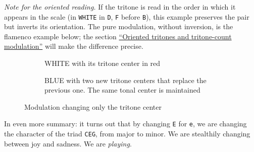 \documentclass[]{report}
\begin{document}
\emph{Note for the oriented reading.} If the tritone is read in the order in
which it appears in the scale (in \texttt{WHITE} in \texttt{D}, \texttt{F}
before \texttt{B}), this example preserves the pair but inverts its
orientation. The pure modulation, without inversion, is the flamenco example
below; the section \hyperref[sec:oriented-tritones]{``Oriented tritones and tritone-count modulation''} will make the difference precise.
\begin{figure}[H]
	\begin{subfigure}{.29\textwidth}
		\centering
		\caption{\textsf{WHITE} with its tritone center in red}

	\end{subfigure}
	\hfill
	\begin{subfigure}{0.29\textwidth}
		\centering
		\caption{\textsf{BLUE} with two new tritone centers that replace the previous one. The same tonal center is maintained}

	\end{subfigure}
	\hfill
	\caption{Modulation changing only the tritone center}\label{fig:modulation-changing-tritonal-center2}
\end{figure}
In even more summary: it turns out that by changing \texttt{E} for \texttt{e}, we are changing the character of the triad \texttt{CEG}, from major to minor. We are stealthily changing between joy and sadness. We are \emph{playing}.
\end{document}
